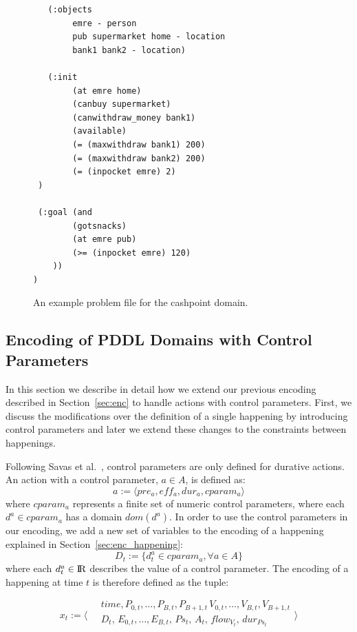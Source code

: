 \begin{figure}[thb]
\small
\begin{verbatim}
   (:objects
        emre - person
        pub supermarket home - location
        bank1 bank2 - location)
 
   (:init
        (at emre home)
        (canbuy supermarket)
        (canwithdraw_money bank1)
 		(available)
        (= (maxwithdraw bank1) 200)
        (= (maxwithdraw bank2) 200)
        (= (inpocket emre) 2)
 )
		
 (:goal (and
        (gotsnacks)
        (at emre pub)
        (>= (inpocket emre) 120)
    ))
)      
\end{verbatim}
\caption{An example problem file for the cashpoint domain.}
\label{fig:cashpoint problem}
\end{figure}

\subsection{Encoding of PDDL Domains with Control Parameters}

In this section we describe in detail how we extend our previous encoding described in Section~\ref{sec:enc} to handle actions with control parameters. First, we discuss the modifications over the definition of a single happening by introducing control parameters and later we extend these changes to the constraints between happenings.

Following Savas et al.~\cite{savas2016planning}, control parameters are only defined for durative actions. An action with a control parameter, $a\in A$, is defined as:
$$
a := \langle pre_a, eff_a, dur_a, cparam_a \rangle
$$
where $cparam_a$ represents a finite set of numeric control parameters, where each $d^a \in cparam_a$ has a domain $dom(d^a)$. In order to use the control parameters in our encoding, we add a new set of variables to the encoding of a happening explained in Section~\ref{sec:enc_happening}:
$$
D_t := \{ d^a_t \in cparam_a, \forall a\in A \}
$$
where each $d^a_t\in {\rm I\!R}$ describes the value of a control parameter. The encoding of a happening at time $t$ is therefore defined as the tuple:

$$
x_t:=\Bigg \langle 
\begin{array}{l}
\quad time,P_{0,t},\ldots,P_{B,t},P_{B+1,t}\,V_{0,t},\ldots, V_{B,t},V_{B+1,t}\\
\quad D_t,\,E_{0,t},\ldots,E_{B,t},\,Ps_t,\,A_t,\,flow_{V_t},\,dur_{Ps_t}\\
\end{array}
\Bigg \rangle 
$$

